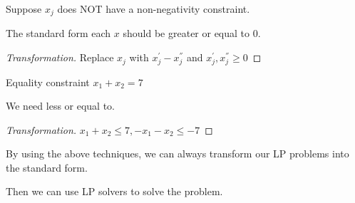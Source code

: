 \begin{example}
    Suppose \(x_j\)  does NOT have a non-negativity constraint.
    \begin{remark}
        The standard form each \(x\) should be greater or equal to 0. 
    \end{remark}
\end{example}
\begin{proof}[Transformation]
    Replace \(x_j\) with \(x_j^{'} - x_j^{''}\) and \(x_j^{'}, x_j^{''} \geq 0\)   
\end{proof}

\begin{example}
    Equality constraint \(x_1 + x_2 = 7\) 
    \begin{remark}
        We need less or equal to.
    \end{remark}
\end{example}
\begin{proof}[Transformation]
    \(x_1 + x_2 \leq 7, -x_1 - x_2 \leq -7\) 
\end{proof}

By using the above techniques, we can always transform our LP problems into the standard form.

Then we can use LP solvers to solve the problem.

